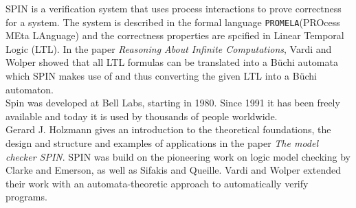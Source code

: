 \documentclass[a4paper]{report}
\begin{document}
SPIN is a verification system that uses process interactions to prove correctness for a system. The system is described in the formal language \texttt{PROMELA}(PROcess MEta LAnguage)\cite{Holzmann1991} and the correctness properties are spcified in Linear Temporal Logic (LTL). In the paper \textit{Reasoning About Infinite Computations}\cite{Vardi1994}, Vardi and Wolper showed that all LTL formulas can be translated into a B\"uchi automata which SPIN makes use of and thus converting the given LTL into a B\"uchi automaton.\\
Spin was developed at Bell Labs, starting in 1980. Since 1991 it has been freely available and today it is used by thousands of people worldwide.\\Gerard J. Holzmann gives an introduction to the theoretical foundations, the design and structure and examples of applications in the paper \textit{The model checker SPIN}\cite{Holzmann1997}. SPIN was build on the pioneering work on logic model checking by Clarke and Emerson\cite{Clarke1981}, as well as Sifakis and Queille\cite{Queille1982}. Vardi and Wolper extended their work with an automata-theoretic approach to automatically verify programs\cite{Vardi1986}.
\end{document}
